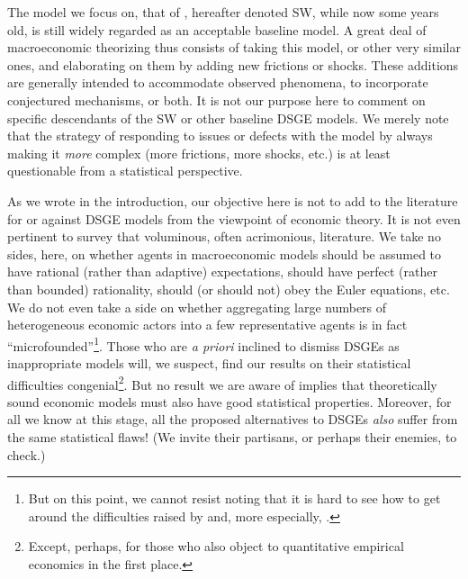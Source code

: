 \documentclass[11pt]{article}
\begin{document}
The model we focus on, that of \citet{SmetsWouters2007}, hereafter
denoted SW, while now some years old, is still widely regarded as an
acceptable baseline model. A great deal of macroeconomic theorizing thus
consists of taking this model, or other very similar ones, and
elaborating on them by adding new frictions or shocks. These additions
are generally intended to accommodate observed phenomena, to incorporate
conjectured mechanisms, or both. It is not our purpose here to comment
on specific descendants of the SW or other baseline DSGE models. We
merely note that the strategy of responding to issues or defects with
the model by always making it \emph{more} complex (more frictions, more
shocks, etc.) is at least questionable from a statistical perspective.

As we wrote in the introduction, our objective here is not to add to the
literature for or against DSGE models from the viewpoint of economic
theory. It is not even pertinent to survey that voluminous, often
acrimonious, literature. We take no sides, here, on whether agents in
macroeconomic models should be assumed to have rational (rather than
adaptive) expectations, should have perfect (rather than bounded)
rationality, should (or should not) obey the Euler equations, etc. We do
not even take a side on whether aggregating large numbers of
heterogeneous economic actors into a few representative agents is in
fact ``microfounded''\footnote{But on this point, we cannot resist
  noting that it is hard to see how to get around the difficulties
  raised by \citet{Kirman-contra-representative-agent} and, more
  especially,
  \citet{Jackson-Yariv-non-existence-of-representative-agents}.}. Those
who are \emph{a priori} inclined to dismiss DSGEs as inappropriate
models will, we suspect, find our results on their statistical
difficulties congenial\footnote{Except, perhaps, for those who also
  object to quantitative empirical economics in the first place.}. But
no result we are aware of implies that theoretically sound economic
models must also have good statistical properties. Moreover, for all we
know at this stage, all the proposed alternatives to DSGEs \emph{also}
suffer from the same statistical flaws! (We invite their partisans, or
perhaps their enemies, to check.)
\end{document}
